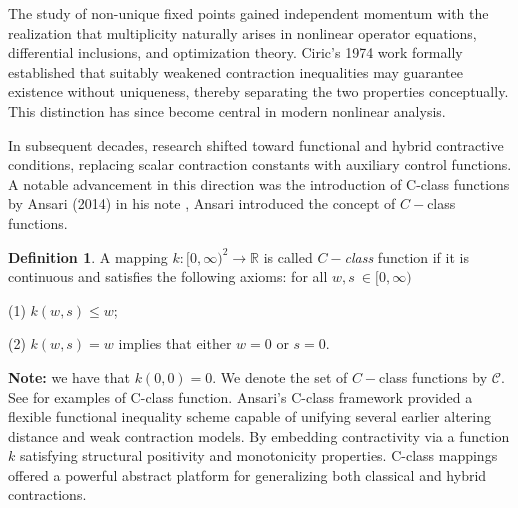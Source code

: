 \documentclass[11pt,reqno]{amsart}
\theoremstyle{definition}
\newtheorem{definition}[theorem]{Definition}
\theoremstyle{remark}
\numberwithin{equation}{section}
\begin{document}
	
	The study of non-unique fixed points gained independent momentum with the realization that multiplicity naturally arises in nonlinear operator equations, differential inclusions, and optimization theory. Ciric’s 1974 work \cite{Ciric1974} formally established that suitably weakened contraction inequalities may guarantee existence without uniqueness, thereby separating the two properties conceptually. This distinction has since become central in modern nonlinear analysis.
	
	In subsequent decades, research shifted toward functional and hybrid contractive conditions, replacing scalar contraction constants with auxiliary control functions. A notable advancement in this direction was the introduction of C-class functions by Ansari (2014) in his note  \cite{Ansari2014}, Ansari introduced the concept of $C-$class functions.	
	\begin{definition}
		\label{def:1.1} \cite{Ansari2014} A mapping $k:[0,\infty )^{2}\rightarrow \mathbb{R}
		$ is called \textit{$C-$class} function if it is continuous and satisfies
		the following axioms: for all $w,s~ \in \lbrack
		0,\infty )$
		
		(1) $k(w,s)\leq w$;
		
		(2) $k(w,s)=w$ implies that either $w=0$ or $s=0.$
	\end{definition}
	
	\noindent	\textbf{Note:} we have that $k(0,0)=0$.
	\newline
	We denote the set of $C-$class functions by $\mathcal{C}$.
	See \cite{Ansari2014} for examples of C-class function.
	Ansari’s C-class framework provided a flexible functional inequality scheme capable of unifying several earlier altering distance and weak contraction models. By embedding contractivity via a function $k$ satisfying structural positivity and monotonicity properties. C-class mappings offered a powerful abstract platform for generalizing both classical and hybrid contractions.
	
\end{document}
